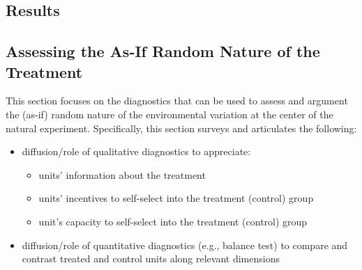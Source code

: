 \documentclass[nobib]{tufte-handout}
\begin{document}
\begin{refsection}
\section{Results}
\label{sec:resuts}

\subsection{Assessing the As-If Random Nature of the Treatment}
\label{sub:random_nature}

This section focuses on the diagnostics that can be used to assess and
argument the (as-if) random nature of the environmental variation at the center
of the natural experiment. Specifically, this section surveys and articulates the
following:

\begin{itemize}
    \item diffusion/role of qualitative diagnostics to appreciate:
        \begin{itemize}
            \item units' information about the treatment
            \item units' incentives to self-select into the treatment (control)
                group
            \item unit's capacity to self-select into the treatment (control)
                group
        \end{itemize}
    \item diffusion/role of quantitative diagnostics (e.g., balance test) to 
        compare and contrast treated and control units along relevant dimensions
\end{itemize}

%
%
%
%
%
%
%
%
%
%
%
%
%


\end{refsection}
\end{document}
